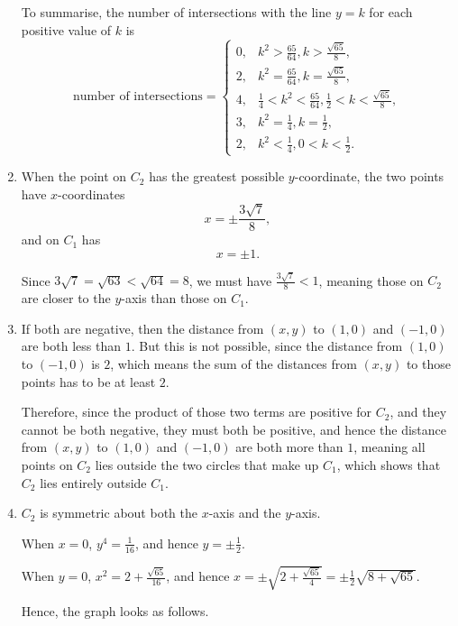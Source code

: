 \begin{enumerate}
          To summarise, the number of intersections with the line \(y = k\) for each positive value of \(k\) is
          \[
              \text{number of intersections} = \begin{cases}
                  0, & k^2 > \frac{65}{64}, k > \frac{\sqrt{65}}{8},                             \\
                  2, & k^2 = \frac{65}{64}, k = \frac{\sqrt{65}}{8},                             \\
                  4, & \frac{1}{4} < k^2 < \frac{65}{64}, \frac{1}{2} < k < \frac{\sqrt{65}}{8}, \\
                  3, & k^2 = \frac{1}{4}, k = \frac{1}{2},                                       \\
                  2, & k^2 < \frac{1}{4}, 0 < k < \frac{1}{2}.
              \end{cases}
          \]

    \item When the point on \(C_2\) has the greatest possible \(y\)-coordinate, the two points have \(x\)-coordinates
          \[
              x = \pm \frac{3\sqrt{7}}{8},
          \]
          and on \(C_1\) has
          \[
              x = \pm 1.
          \]

          Since \(3 \sqrt{7} = \sqrt{63} < \sqrt{64} = 8\), we must have \(\frac{3\sqrt{7}}{8} < 1\), meaning those on \(C_2\) are closer to the \(y\)-axis than those on \(C_1\).

    \item If both are negative, then the distance from \((x, y)\) to \((1, 0)\) and \((-1, 0)\) are both less than \(1\). But this is not possible, since the distance from \((1, 0)\) to \((-1, 0)\) is \(2\), which means the sum of the distances from \((x, y)\) to those points has to be at least \(2\).

          Therefore, since the product of those two terms are positive for \(C_2\), and they cannot be both negative, they must both be positive, and hence the distance from \((x, y)\) to \((1, 0)\) and \((-1, 0)\) are both more than \(1\), meaning all points on \(C_2\) lies outside the two circles that make up \(C_1\), which shows that \(C_2\) lies entirely outside \(C_1\).

    \item \(C_2\) is symmetric about both the \(x\)-axis and the \(y\)-axis.

          When \(x = 0\), \(y^4 = \frac{1}{16}\), and hence \(y = \pm \frac{1}{2}\).

          When \(y = 0\), \(x^2 = 2 + \frac{\sqrt{65}}{16}\), and hence \(x = \pm \sqrt{2 + \frac{\sqrt{65}}{{4}}} = \pm \frac{1}{2} \sqrt{8 + \sqrt{65}}\).

          Hence, the graph looks as follows.
          \begin{center}
              
          \end{center}
\end{enumerate}